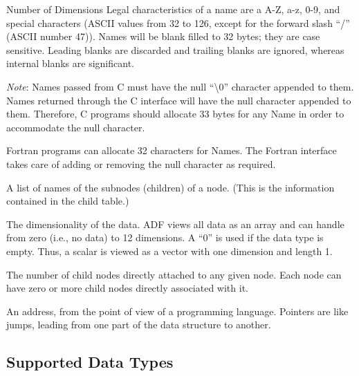\begin{Ventryi}{Number of Dimensions}
      Legal characteristics of a name are a A-Z, a-z, 0-9, and special
      characters (ASCII values from 32 to 126, except for the forward
      slash ``/'' (ASCII number 47)).
      Names will be blank filled to 32 bytes; they are case sensitive.
      Leading blanks are discarded and trailing blanks are ignored,
      whereas internal blanks are significant.

      \emph{Note}: Names passed from C must have the null
      ``\textbackslash0'' character appended to them.
      Names returned through the C interface will have the
      null character appended to them.
      Therefore, C programs should allocate 33 bytes for any Name in
      order to accommodate the null character.

      Fortran programs can allocate 32 characters for Names.
      The Fortran interface takes care of adding or removing the null
      character as required.
\item [Names of Subnodes]
      A list of names of the subnodes (children) of a node.
      (This is the information contained in the child table.)
\item [Number of Dimensions]
      The dimensionality of the data.
      ADF views all data as an array and can handle from zero (i.e., no
      data) to 12 dimensions.
      A ``0'' is used if the data type is empty.
      Thus, a scalar is viewed as a vector with one dimension and
      length 1.
\item [Number of Subnodes]
      The number of child nodes directly attached to any given node.
      Each node can have zero or more child nodes directly associated
      with it.
\item [Pointer]
      An address, from the point of view of a programming language.
      Pointers are like jumps, leading from one part of the data
      structure to another.
\end{Ventryi}

\subsection{Supported Data Types}

